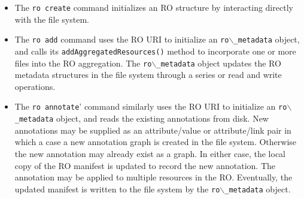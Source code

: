 \begin{itemize}

\item The \texttt{ro create} command initializes an RO structure by interacting directly with the file system.

\item The \texttt{ro add} command uses the RO URI to initialize an \texttt{ro$\backslash$\_metadata} object, and calls its \texttt{addAggregatedResources()} method to incorporate one or more files into the RO aggregation. The \texttt{ro$\backslash$\_metadata} object updates the RO metadata structures in the file system through a series or read and write operations.

\item The \texttt{ro annotate}' command similarly uses the RO URI to initialize an \texttt{ro$\backslash$\_metadata} object, and reads the existing annotations from disk. New annotations may be supplied as an attribute/value or attribute/link pair in which a case a new annotation graph is created in the file system. Otherwise the new annotation may already exist as a graph. In either case, the local copy of the RO manifest is updated to record the new annotation. The annotation may be applied to multiple resources in the RO. Eventually, the updated manifest is written to the file system by the \texttt{ro$\backslash$\_metadata} object.
\end{itemize}






